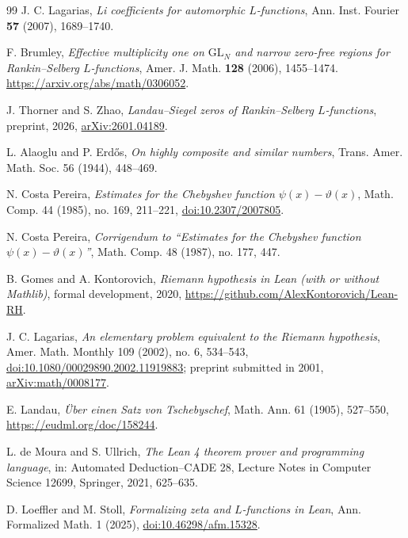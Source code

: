 \documentclass[11pt]{amsart}
\theoremstyle{definition}
\theoremstyle{remark}
\numberwithin{equation}{section}
\begin{document}
\begin{thebibliography}{99}
J. C. Lagarias,
\emph{Li coefficients for automorphic $L$-functions},
Ann. Inst. Fourier \textbf{57} (2007), 1689--1740.

F. Brumley, \emph{Effective multiplicity one on
\(\mathrm{GL}_N\) and narrow zero-free regions for Rankin--Selberg
\(L\)-functions}, Amer. J. Math. \textbf{128} (2006), 1455--1474.
\url{https://arxiv.org/abs/math/0306052}.

J. Thorner and S. Zhao,
\emph{Landau--Siegel zeros of Rankin--Selberg $L$-functions},
preprint, 2026,
\href{https://arxiv.org/abs/2601.04189}{arXiv:2601.04189}.

L. Alaoglu and P. Erd\H{o}s,
\emph{On highly composite and similar numbers},
Trans. Amer. Math. Soc. 56 (1944), 448--469.

N. Costa Pereira,
\emph{Estimates for the Chebyshev function $\psi(x)-\vartheta(x)$},
Math. Comp. 44 (1985), no. 169, 211--221,
\href{https://doi.org/10.2307/2007805}{doi:10.2307/2007805}.

N. Costa Pereira,
\emph{Corrigendum to ``Estimates for the Chebyshev function
$\psi(x)-\vartheta(x)$''},
Math. Comp. 48 (1987), no. 177, 447.

B. Gomes and A. Kontorovich,
\emph{Riemann hypothesis in Lean (with or without Mathlib)},
formal development, 2020,
\url{https://github.com/AlexKontorovich/Lean-RH}.

J. C. Lagarias,
\emph{An elementary problem equivalent to the Riemann hypothesis},
Amer. Math. Monthly 109 (2002), no. 6, 534--543,
\href{https://doi.org/10.1080/00029890.2002.11919883}
{doi:10.1080/00029890.2002.11919883};
preprint submitted in 2001,
\href{https://arxiv.org/abs/math/0008177}{arXiv:math/0008177}.

E. Landau,
\emph{\"Uber einen Satz von Tschebyschef},
Math. Ann. 61 (1905), 527--550,
\url{https://eudml.org/doc/158244}.

L. de Moura and S. Ullrich,
\emph{The Lean 4 theorem prover and programming language},
in: Automated Deduction--CADE 28, Lecture Notes in Computer Science 12699,
Springer, 2021, 625--635.

D. Loeffler and M. Stoll,
\emph{Formalizing zeta and $L$-functions in Lean},
Ann. Formalized Math. 1 (2025),
\href{https://doi.org/10.46298/afm.15328}{doi:10.46298/afm.15328}.


\end{thebibliography}
\end{document}
